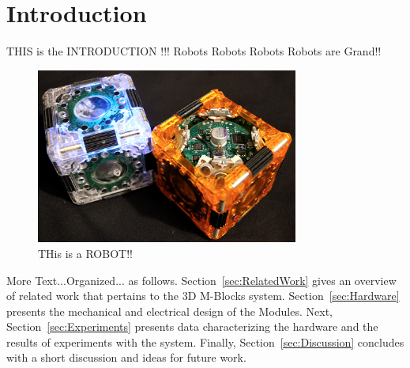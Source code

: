 \section{Introduction}
\label{sec:Introduction}

THIS is the INTRODUCTION !!! Robots Robots Robots Robots are Grand!!
\begin{figure}[htb]  

  \centering
  \includegraphics[width=3.4in]{Figures/cover.png}

  \caption{THis is a ROBOT!!}
    
  \label{fig:cover}    
\end{figure}

More Text...Organized... as follows. Section~\ref{sec:RelatedWork} gives an overview of related
work that pertains to the 3D M-Blocks
system. Section~\ref{sec:Hardware} presents the mechanical and
electrical design of the Modules. Next, Section~\ref{sec:Experiments}
presents data characterizing the hardware and the results of
experiments with the system. Finally, Section~\ref{sec:Discussion}
concludes with a short discussion and ideas for future work.